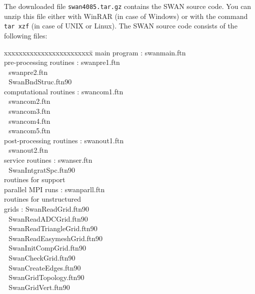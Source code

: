 \documentclass[12pt]{book}
\begin{document}
The downloaded file {\tt swan4085.tar.gz} contains the SWAN source code. You can unzip this
file either with WinRAR (in case of Windows) or with the command {\tt tar xzf} (in case of
UNIX or Linux). The SWAN source code consists of the following files:
\begin{tabbing}
xxxxxxxxxxxxxxxxxxxxxxxx\= \kill
main program             \>:       swanmain.ftn \\
pre-processing routines  \>:       swanpre1.ftn \\
                         \> $\,\,$ swanpre2.ftn \\
                         \> $\,\,$ SwanBndStruc.ftn90 \\
computational routines   \>:       swancom1.ftn \\
                         \> $\,\,$ swancom2.ftn \\
                         \> $\,\,$ swancom3.ftn \\
                         \> $\,\,$ swancom4.ftn \\
                         \> $\,\,$ swancom5.ftn \\
post-processing routines \>:       swanout1.ftn \\
                         \> $\,\,$ swanout2.ftn \\
service routines         \>:       swanser.ftn \\
                         \> $\,\,$ SwanIntgratSpc.ftn90 \\
routines for support     \> \\
parallel MPI runs        \>:       swanparll.ftn \\
routines for unstructured \> $\,\,$ \\
grids                     \>:       SwanReadGrid.ftn90 \\
                          \> $\,\,$ SwanReadADCGrid.ftn90 \\
                          \> $\,\,$ SwanReadTriangleGrid.ftn90 \\
                          \> $\,\,$ SwanReadEasymeshGrid.ftn90 \\
                          \> $\,\,$ SwanInitCompGrid.ftn90 \\
                          \> $\,\,$ SwanCheckGrid.ftn90 \\
                          \> $\,\,$ SwanCreateEdges.ftn90 \\
                          \> $\,\,$ SwanGridTopology.ftn90 \\
                          \> $\,\,$ SwanGridVert.ftn90 \\

\end{tabbing}
\end{document}
